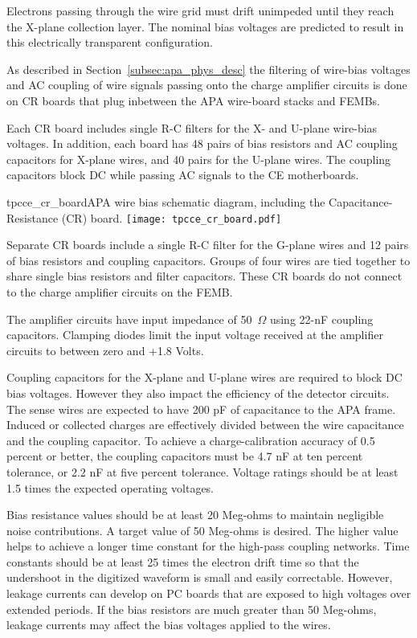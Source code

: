 Electrons passing through the wire grid must drift unimpeded until they reach the X-plane 
collection layer. The nominal bias voltages are predicted to result in this electrically 
transparent configuration.

As described in Section~\ref{subsec:apa_phys_desc}
 the filtering of wire-bias voltages and AC coupling of wire signals passing
onto the charge amplifier circuits is done on  CR boards that plug inbetween the APA wire-board stacks and FEMBs.

Each CR board includes single R-C filters for the X- and U-plane wire-bias voltages. In addition, each board has 48 
pairs of bias resistors and AC coupling capacitors for X-plane wires, and 40 pairs for the U-plane wires. The coupling capacitors block DC while passing AC 
signals to the CE motherboards.

\begin{cdrfigure}{tpcce_cr_board}{APA wire bias 
schematic diagram, including the Capacitance-Resistance (CR) board.}
\texttt{[image: tpcce\_cr\_board.pdf]}
\end{cdrfigure}

Separate CR boards include a single R-C filter for the G-plane wires and 12 pairs of bias resistors and
coupling capacitors.
Groups of four wires are tied together to share single
bias resistors and filter capacitors. These CR boards do not connect to the charge amplifier circuits on the FEMB.

The amplifier circuits 
have input impedance of 50~$\Omega$ using 22-nF coupling capacitors. 
Clamping diodes limit the input voltage received at the amplifier circuits to between zero and +1.8 Volts.


Coupling capacitors for the X-plane and U-plane wires are required to block DC bias voltages.
However they also impact the efficiency of the detector circuits.
The sense wires are expected to have 200 pF of capacitance to the APA frame.
Induced or collected charges are effectively divided between the wire capacitance and the coupling capacitor.
To achieve a charge-calibration accuracy of 0.5 percent or better,
the coupling capacitors must be 4.7 nF at ten percent tolerance, or 2.2 nF at five percent tolerance.
Voltage ratings should be at least 1.5 times the expected operating voltages.

Bias resistance values should be at least 20 Meg-ohms to maintain negligible noise contributions.
A target value of 50 Meg-ohms is desired.
The higher value helps to achieve a longer time constant for the high-pass coupling networks.
Time constants should be at least 25 times the electron drift time so that the undershoot in the digitized waveform
is small and easily correctable.
However, leakage currents can develop on PC boards that are exposed to high voltages over extended periods.
If the bias resistors are much greater than 50 Meg-ohms, leakage currents may affect the bias voltages applied to the wires.

